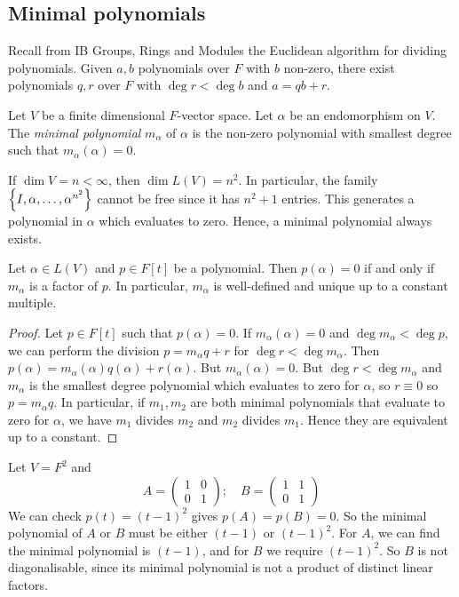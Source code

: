\subsection{Minimal polynomials}
Recall from IB Groups, Rings and Modules the Euclidean algorithm for dividing polynomials.
Given \( a, b \) polynomials over \( F \) with \( b \) non-zero, there exist polynomials \( q, r \) over \( F \) with \( \deg r < \deg b \) and \( a = qb + r \).
\begin{definition}
	Let \( V \) be a finite dimensional \( F \)-vector space.
	Let \( \alpha \) be an endomorphism on \( V \).
	The \textit{minimal polynomial} \( m_\alpha \) of \( \alpha \) is the non-zero polynomial with smallest degree such that \( m_\alpha(\alpha) = 0 \).
\end{definition}
\begin{remark}
	If \( \dim V = n < \infty \), then \( \dim L(V) = n^2 \).
	In particular, the family \( \qty{I, \alpha, \dots, \alpha^{n^2}} \) cannot be free since it has \( n^2+1 \) entries.
	This generates a polynomial in \( \alpha \) which evaluates to zero.
	Hence, a minimal polynomial always exists.
\end{remark}
\begin{lemma}
	Let \( \alpha \in L(V) \) and \( p \in F[t] \) be a polynomial.
	Then \( p(\alpha) = 0 \) if and only if \( m_\alpha \) is a factor of \( p \).
	In particular, \( m_\alpha \) is well-defined and unique up to a constant multiple.
\end{lemma}
\begin{proof}
	Let \( p \in F[t] \) such that \( p(\alpha) = 0 \).
	If \( m_\alpha(\alpha) = 0 \) and \( \deg m_\alpha < \deg p \), we can perform the division \( p = m_\alpha q + r \) for \( \deg r < \deg m_\alpha \).
	Then \( p(\alpha) = m_\alpha(\alpha) q(\alpha) + r(\alpha) \).
	But \( m_\alpha(\alpha) = 0 \).
	But \( \deg r < \deg m_\alpha \) and \( m_\alpha \) is the smallest degree polynomial which evaluates to zero for \( \alpha \), so \( r \equiv 0 \) so \( p = m_\alpha q \).
	In particular, if \( m_1, m_2 \) are both minimal polynomials that evaluate to zero for \( \alpha \), we have \( m_1 \) divides \( m_2 \) and \( m_2 \) divides \( m_1 \).
	Hence they are equivalent up to a constant.
\end{proof}
\begin{example}
	Let \( V = F^2 \) and
	\[
		A= \begin{pmatrix}
			1 & 0 \\
			0 & 1
		\end{pmatrix};\quad B = \begin{pmatrix}
			1 & 1 \\
			0 & 1
		\end{pmatrix}
	\]
	We can check \( p(t) = (t-1)^2 \) gives \( p(A) = p(B) = 0 \).
	So the minimal polynomial of \( A \) or \( B \) must be either \( (t-1) \) or \( (t-1)^2 \).
	For \( A \), we can find the minimal polynomial is \( (t-1) \), and for \( B \) we require \( (t-1)^2 \).
	So \( B \) is not diagonalisable, since its minimal polynomial is not a product of distinct linear factors.
\end{example}

